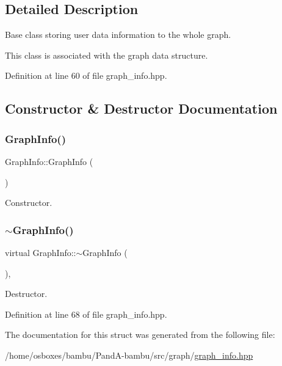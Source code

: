 \subsection{Detailed Description}
Base class storing user data information to the whole graph. 

This class is associated with the graph data structure. 

Definition at line 60 of file graph\+\_\+info.\+hpp.



\subsection{Constructor \& Destructor Documentation}
\mbox{\label{structGraphInfo_a4e539fcf1c2889d54527cf5d49a0368a}} 
\subsubsection{\texorpdfstring{Graph\+Info()}{GraphInfo()}}
{\footnotesize\ttfamily Graph\+Info\+::\+Graph\+Info (\begin{DoxyParamCaption}{ }\end{DoxyParamCaption})\hspace{0.3cm}{\ttfamily [default]}}



Constructor. 

\mbox{\label{structGraphInfo_a32f3aa11c3b38d6c0ceefbcda0e3c93c}} 
\subsubsection{\texorpdfstring{$\sim$\+Graph\+Info()}{~GraphInfo()}}
{\footnotesize\ttfamily virtual Graph\+Info\+::$\sim$\+Graph\+Info (\begin{DoxyParamCaption}{ }\end{DoxyParamCaption})\hspace{0.3cm}{\ttfamily [inline]}, {\ttfamily [virtual]}}



Destructor. 



Definition at line 68 of file graph\+\_\+info.\+hpp.



The documentation for this struct was generated from the following file\+:\begin{DoxyCompactItemize}
\item 
/home/osboxes/bambu/\+Pand\+A-\/bambu/src/graph/\hyperlink{graph__info_8hpp}{graph\+\_\+info.\+hpp}\end{DoxyCompactItemize}
